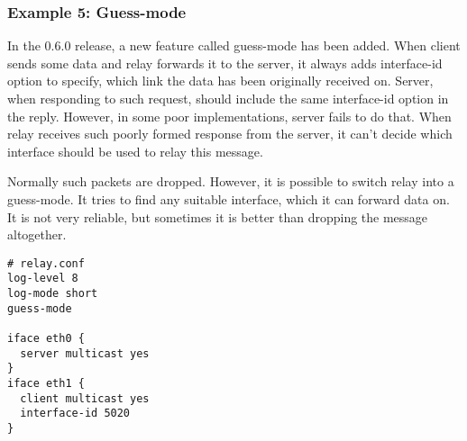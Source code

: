 \subsubsection{Example 5: Guess-mode}
In the 0.6.0 release, a new feature called guess-mode has been
added. When client sends some data and relay forwards it to the
server, it always adds interface-id option to specify, which link
the data has been originally received on. Server, when responding to
such request, should include the same interface-id option in the
reply. However, in some poor implementations, server fails to do
that. When relay receives such poorly formed response from the server,
it can't decide which interface should be used to relay this
message. 

Normally such packets are dropped. However, it is possible to switch
relay into a guess-mode. It tries to find any suitable interface,
which it can forward data on. It is not very reliable, but sometimes
it is better than dropping the message altogether.

\begin{lstlisting}
# relay.conf
log-level 8
log-mode short
guess-mode

iface eth0 {
  server multicast yes
}
iface eth1 {
  client multicast yes
  interface-id 5020
}
\end{lstlisting}
